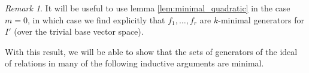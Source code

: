 \documentclass{amsart}
\theoremstyle{plain}
\newtheorem{lem}[thm]{Lemma}
\theoremstyle{definition}
\theoremstyle{remark}
\newtheorem{rem}[thm]{Remark}
\numberwithin{equation}{section}
\begin{document}
%
%
%
%
%

\begin{rem}
\label{rem:minimal_quadratic_trivial_case}
It will be useful to use lemma \ref{lem:minimal_quadratic} in the
case $m=0$, in which case we find explicitly that $f_1, \ldots, f_r$
are $k$-minimal generators for $I'$ (over the trivial base vector
space).  
\end{rem}

With this result, we will be able to show that the sets of generators of the ideal of relations in many of the following inductive arguments are minimal.
\end{document}
